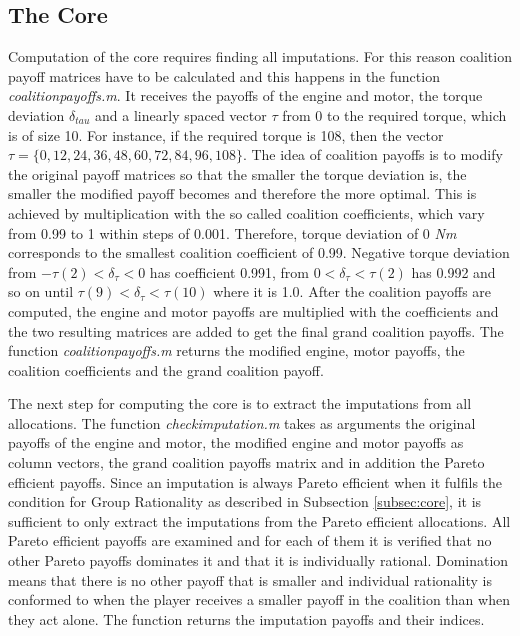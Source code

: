 \subsection{The Core}
Computation of the core requires finding all imputations. For this reason coalition payoff matrices have  to be calculated and this happens in the function \textit{coalitionpayoffs.m}. It receives the payoffs of the engine and motor, the torque deviation $\delta_{tau}$ and a linearly spaced vector $\tau$ from 0 to the required torque, which is of size 10. For instance, if the required torque is 108, then the vector  $\tau = \{0,12,24,36,48,60,72,84,96,108\}$. The idea of coalition payoffs is to modify the original payoff matrices so that the smaller the torque deviation is, the smaller the modified payoff becomes and therefore the more optimal. This is achieved by multiplication with the so called coalition coefficients, which vary from 0.99 to 1 within steps of 0.001. Therefore, torque deviation of 0 \textit{Nm} corresponds to the smallest coalition coefficient of 0.99. Negative torque deviation from $-\tau(2) < \delta_{\tau} < 0$ has coefficient 0.991, from $ 0 < \delta_{\tau} < \tau(2)$ has 0.992 and so on until $\tau(9) < \delta_{\tau} < \tau(10)$ where it is 1.0. After the coalition payoffs are computed, the engine and motor payoffs are multiplied with the coefficients and the two resulting matrices are added to get the final grand coalition payoffs. The function \textit{coalitionpayoffs.m} returns the modified engine, motor payoffs, the coalition coefficients and the grand coalition payoff. 

The next step for computing the core is to extract the imputations from all allocations. The function \textit{checkimputation.m} takes as arguments the original payoffs of the engine and motor, the modified engine and motor payoffs as column vectors, the grand coalition payoffs matrix and in addition the Pareto efficient payoffs. Since an imputation is always Pareto efficient when it fulfils the condition for Group Rationality as described in Subsection \ref{subsec:core}, it is sufficient to only extract the imputations from the Pareto efficient allocations. All Pareto efficient payoffs are examined and for each of them it is verified that no other Pareto payoffs dominates it and that it is individually rational. Domination means that there is no other payoff that is smaller and individual rationality is conformed to when the player receives a smaller payoff in the coalition than when they act alone. The function returns the imputation payoffs and their indices.

